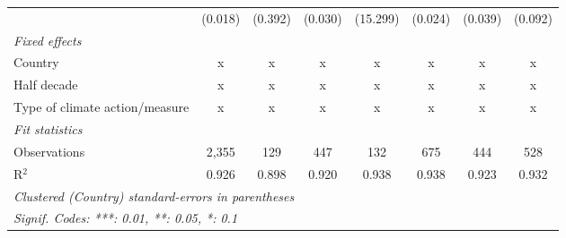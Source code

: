 \begin{table}[htbp]
\begin{tabular}{lccccccc}
                                                                                    & (0.018)       & (0.392)                   & (0.030)        & (15.299)         & (0.024)         & (0.039)         & (0.092)\\   
      \emph{Fixed effects}\\
      Country                                                                       & x             & x                         & x              & x                & x               & x               & x\\  
      Half decade                                                                   & x             & x                         & x              & x                & x               & x               & x\\  
      Type of climate action/measure                                                & x             & x                         & x              & x                & x               & x               & x\\  
      \midrule \emph{Fit statistics}\\
      Observations                                                                  & 2,355         & 129                       & 447            & 132              & 675             & 444             & 528\\  
      R$^2$                                                                         & 0.926         & 0.898                     & 0.920          & 0.938            & 0.938           & 0.923           & 0.932\\  
      \midrule
      \multicolumn{8}{l}{\emph{Clustered (Country) standard-errors in parentheses}}\\
      \multicolumn{8}{l}{\emph{Signif. Codes: ***: 0.01, **: 0.05, *: 0.1}}\\
   \end{tabular}
\end{table}


